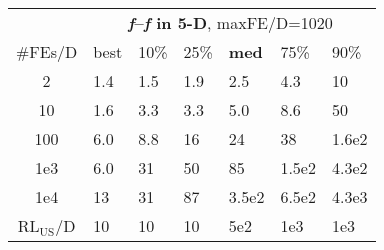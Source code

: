 \begin{tabular}{c|llllll}
 & \multicolumn{6}{|c}{\textbf{\textit{f}\raisebox{-0.35ex}{1}--\textit{f}\raisebox{-0.35ex}{24} in 5-D}, maxFE/D=1020}\\
\#FEs/D & best & 10\% & 25\% & \textbf{med} & 75\% & 90\%\\
2 & \hspace*{1ex}1.4 & \hspace*{1ex}1.5 & \hspace*{1ex}1.9 & \hspace*{1ex}2.5 & \hspace*{1ex}4.3 & 10\\
10 & \hspace*{1ex}1.6 & \hspace*{1ex}3.3 & \hspace*{1ex}3.3 & \hspace*{1ex}5.0 & \hspace*{1ex}8.6 & 50\\
100 & \hspace*{1ex}6.0 & \hspace*{1ex}8.8 & 16 & 24 & 38 & 1.6e2\\
1e3 & \hspace*{1ex}6.0 & 31 & 50 & 85 & 1.5e2 & 4.3e2\\
1e4 & 13 & 31 & 87 & 3.5e2 & 6.5e2 & 4.3e3\\
$\text{RL}_{\text{US}}$/D & 10 & 10 & 10 & 5e2 & 1e3 & 1e3
\end{tabular}

